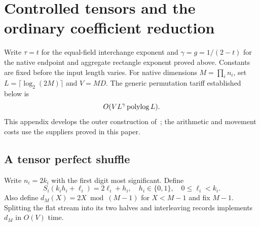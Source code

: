 \section{Controlled tensors and the ordinary coefficient reduction}
\label{app:outer}
Write $\tau=t$ for the equal-field interchange exponent and
$\gamma=g=1/(2-t)$ for the native endpoint and aggregate rectangle
exponent proved above. Constants are fixed before the input length
varies. For native dimensions $M=\prod_i n_i$, set
$L=\lceil\log_2(2M)\rceil$ and $V=MD$. The generic permutation tariff
established below is
\begin{equation}
 O(VL^\gamma\operatorname{polylog} L).
\end{equation}
This appendix develops the outer construction of~\cite{release}; the
arithmetic and movement costs use the suppliers proved in this paper.
\subsection{A tensor perfect shuffle}

Write $n_i=2k_i$ with the first digit most significant. Define
\[
 S_i(k_i h_i+\ell_i)=2\ell_i+h_i,
 \quad h_i\in\{0,1\},\quad 0\le\ell_i<k_i.
\]
Also define $d_M(X)=2X\bmod(M-1)$ for $X<M-1$ and fix $M-1$.
Splitting the flat stream into its two halves and interleaving records
implements $d_M$ in $O(V)$ time.

